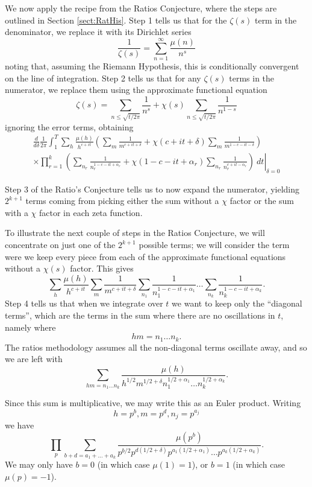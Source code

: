 \documentclass[12pt,a4paper,reqno]{amsart}
\theoremstyle{remark}
\numberwithin{equation}{section}
\begin{document}
We now apply the recipe from the Ratios Conjecture, where the steps are outlined in Section \ref{sect:RatHis}. Step 1 tells us that for the $\zeta (s)$ term in the denominator, we replace it with its Dirichlet series
\[
\frac{1}{\zeta (s)} = \sum_{n=1}^{\infty} \frac{\mu (n)}{n^s}
\]
noting that, assuming the Riemann Hypothesis, this is conditionally convergent on the line of integration. Step 2 tells us that for any $\zeta (s)$ terms in the numerator, we replace them using the approximate functional equation
\[
\zeta (s) = \sum_{n \leq \sqrt{t/2 \pi}} \frac{1}{n^s} + \chi (s) \sum_{n \leq \sqrt{t/2 \pi}} \frac{1}{n^{1-s}}
\]
ignoring the error terms, obtaining
\begin{multline}\label{eq:shiftedzetaint}
	\frac{d}{d \delta} \frac{1}{2 \pi} \int_{1}^{T}   \sum_h \frac{\mu(h)}{h^{c+it}}  \left(\sum_m \frac{1}{m^{c+it+\delta}} + \chi (c+it+\delta) \sum_m \frac{1}{m^{1-c-it-\delta}}\right) \\ \times \left. \prod_{r=1}^k \left(\sum_{n_r} \frac{1}{n_r^{1-c-it+\alpha_r}} + \chi (1-c-it+\alpha_r) \sum_{n_r} \frac{1}{n_r^{c+it-\alpha_r}}\right)  \ dt \right|_{\delta=0}
\end{multline}


Step 3 of the Ratio's Conjecture tells us to now expand the numerator, yielding $2^{k+1}$ terms coming from picking either the sum without a $\chi$ factor or the sum with a $\chi$ factor in each zeta function.


To illustrate the next couple of steps in the Ratios Conjecture, we will concentrate on just one of the $2^{k+1}$ possible terms; we will consider the term were we keep every piece from each of the approximate functional equations without a $\chi (s)$ factor. This gives
\[
\sum_h \frac{\mu(h)}{h^{c+it}} \sum_m \frac{1}{m^{c+it+\delta}}  \sum_{n_1} \frac{1}{n_1^{1-c-it+\alpha_1}} \dots\sum_{n_k} \frac{1}{n_k^{1-c-it+\alpha_k}} .
\]
Step 4 tells us that when we integrate over $t$ we want to keep only the ``diagonal terms'', which are the terms in the sum where there are no oscillations in $t$, namely where
\[
hm = n_1\dots n_k.
\]
The ratios methodology assumes all the non-diagonal terms oscillate away, and so we are left with
\[
\sum_{hm = n_1\dots n_k} \frac{\mu(h)}{h^{1/2} m^{1/2+\delta} n_1^{1/2+\alpha_1} \dots n_k^{1/2+\alpha_k}}.
\]


Since this sum is multiplicative, we may write this as an Euler product. Writing
\[
h = p^b, m = p^d, n_j = p^{a_j}
\]
we have
\[
\prod_p \sum_{b+d = a_1 + \dots + a_k} \frac{\mu (p^b)}{p^{b/2} p^{d(1/2+\delta)} p^{a_1(1/2+\alpha_1)} \dots p^{a_k(1/2+\alpha_k)}}.
\]
We may only have $b=0$ (in which case $\mu(1) =1$), or $b=1$ (in which case $\mu(p) = -1$).
\end{document}
